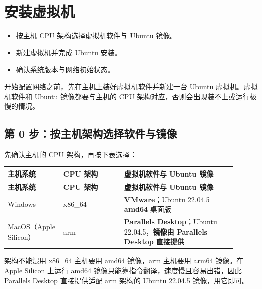 \chapter*{安装虚拟机}
\label{chap:install}
\begin{intro}
\begin{itemize}
\item 按主机 CPU 架构选择虚拟机软件与 Ubuntu 镜像。
\item 新建虚拟机并完成 Ubuntu 安装。
\item 确认系统版本与网络初始状态。
\end{itemize}
\end{intro}
开始配置网络之前，先在主机上装好虚拟机软件并新建一台 Ubuntu 虚拟机。虚拟机软件和 Ubuntu 镜像都要与主机的 CPU 架构对应，否则会出现装不上或运行极慢的情况。

\section{第 0 步：按主机架构选择软件与镜像}
\label{step:0}
先确认主机的 CPU 架构，再按下表选择：

\begin{longtable}{@{}P{0.22\linewidth}P{0.24\linewidth}P{0.44\linewidth}@{}}
\toprule
\textbf{主机系统} & \textbf{CPU 架构} & \textbf{虚拟机软件与 Ubuntu 镜像} \\
\midrule
\endfirsthead
\toprule
\textbf{主机系统} & \textbf{CPU 架构} & \textbf{虚拟机软件与 Ubuntu 镜像} \\
\midrule
\endhead
\bottomrule
\endfoot
Windows & x86\_64 & \textbf{VMware}；Ubuntu 22.04.5 \textbf{amd64} 桌面版 \\
MacOS（Apple Silicon） & arm & \textbf{Parallels Desktop}；Ubuntu 22.04.5，\textbf{镜像由 Parallels Desktop 直接提供} \\
\end{longtable}

\begin{remark}{架构不能混用}
x86\_64 主机要用 amd64 镜像，arm 主机要用 arm64 镜像。在 Apple Silicon 上运行 amd64 镜像只能靠指令翻译，速度慢且容易出错，因此 Parallels Desktop 直接提供适配 arm 架构的 Ubuntu 22.04.5 镜像，用它即可。
\end{remark}

